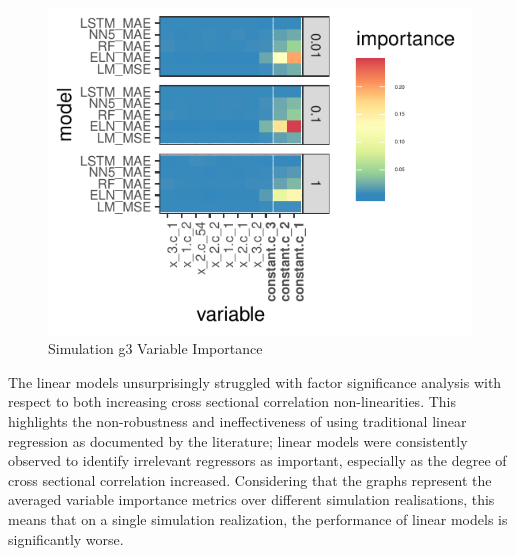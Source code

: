 \documentclass{article}
\begin{document}
\begin{figure}
	\includegraphics[]{../../Results/simulation/graphics/simulation_g3_vi.pdf}
	\caption{Simulation g3 Variable Importance}
\end{figure}

The linear models unsurprisingly struggled with factor significance analysis with respect to both increasing cross sectional correlation non-linearities. This highlights the non-robustness and ineffectiveness of using traditional linear regression as documented by the literature; linear models were consistently observed to identify irrelevant regressors as important, especially as the degree of cross sectional correlation increased. Considering that the graphs represent the averaged variable importance metrics over different simulation realisations, this means that on a single simulation realization, the performance of linear models is significantly worse.


\end{document}
